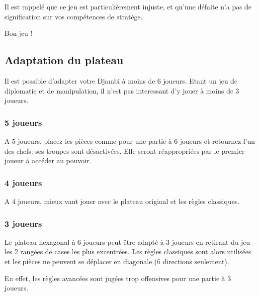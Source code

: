 \documentclass{article}
\begin{document}
\vspace{10pt} %

Il est rappelé que ce jeu est particulièrement injuste, et qu'une défaite n'a pas de signification sur vos compétences de stratège.
\vspace{10pt} %

Bon jeu !

\newpage

\subsection{Adaptation du plateau}

Il est possible d'adapter votre Djambi à moins de 6 joueurs. Etant un jeu de diplomatie et de manipulation, il n'est pas interessant d'y jouer à moins de 3 joueurs.

\subsubsection{5 joueurs}

A 5 joueurs, placez les pièces comme pour une partie à 6 joueurs et retournez l'un des chefs: ses troupes sont désactivées.
Elle seront réappropriées par le premier joueur à accéder au pouvoir.

\subsubsection{4 joueurs}

A 4 joueurs, mieux vaut jouer avec le plateau original et les règles classiques.

\subsubsection{3 joueurs}


Le plateau hexagonal à 6 joueurs peut être adapté à 3 joueurs en retirant du jeu les 2 rangées de cases les plus excentrées.
Les règles classiques sont alors utilisées et les pièces ne peuvent se déplacer en diagonale (6 directions seulement).

En effet, les règles avancées sont jugées trop offensives pour une partie à 3 joueurs.

\vspace{5pt} %
\end{document}
